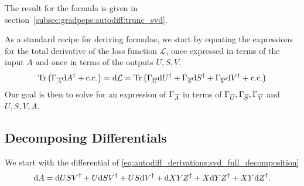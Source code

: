 The result for the  formula is given in section~\ref{subsec:gradpeps:autodiff:trunc_svd}.

As a standard recipe for deriving  formulae, we start by equating the expressions for the total derivative of the loss function $\mathcal{L}$, once expressed in terms of the input $A$ and once in terms of the outputs $U, S, V$.
%
\begin{equation}
    \label{eq:autodiff_derivations:dL_in_two_forms}
    \tr{\Gconj{A} \d{A}^\dagger \pcc}
    = \d{\mathcal{L}}
    = \tr{\Gconj{U} \d{U}^\dagger + \Gconj{S} \d{S}^\dagger + \Gconj{V} \d{V}^\dagger \pcc}
\end{equation}
%
Our goal is then to solve for an expression of $\Gamma_{\overline{A}}$ in terms of $\Gamma_{\overline{U}}, \Gamma_{\overline{S}}, \Gamma_{\overline{V}}$ and $U, S, V, A$.

\subsection{Decomposing Differentials}
\label{subsec:autodiff_derivation:svd:decomposing_differentials}

We start with the differential of \eqref{eq:autodiff_derivations:svd_full_decomposition}
\begin{equation}
    \label{eq:autodiff_derivations:dA_full}
    \mathrm{d}{A}
    = \mathrm{d}{U} S V^{\dagger} + U \mathrm{d}{S} V^{\dagger} + U S \mathrm{d}{V}^{\dagger} 
    + \mathrm{d}{X} Y Z^{\dagger} + X \mathrm{d}{Y} Z^{\dagger} + X Y \mathrm{d}{Z}^{\dagger}
    .
\end{equation}


